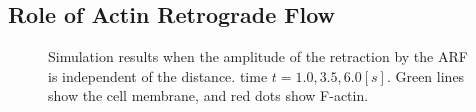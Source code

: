 \documentclass[a4paper,12pt, oneside]{book}
\begin{document}
\subsection{Role of Actin Retrograde Flow}
\begin{figure}[tbp]
 \caption{Simulation results when the amplitude of the retraction by the ARF is independent of the distance. time $t = 1.0, 3.5, 6.0 [s]$. Green lines show the cell membrane, and red dots show F-actin.}
 \label{fig:res0}
\end{figure}
\end{document}
